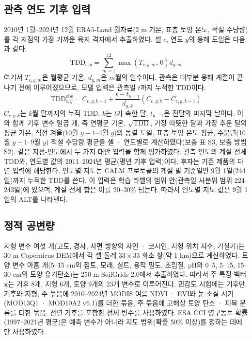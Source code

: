 \subsection{관측 연도 기후 입력}
2010년 1월--2024년 12월 ERA5-Land 월자료\cite{munozsabater2021_era5_land}(2 m 기온, 표층 토양 온도, 적설 수당량)를 각 지점의 가장 가까운 육지 격자에서 추출하였다. 셀 $c$, 연도 $y$의 융해 도일은 다음과 같다.
\begin{equation}
\mathrm{TDD}_{c,y} = \sum_{m=1}^{12} \max\!\left(T_{c,y,m},\,0\right) d_{y,m}
\label{eq:tdd}
\end{equation}
여기서 $T_{c,y,m}$은 월평균 기온, $d_{y,m}$은 $m$월의 일수이다. 관측은 대부분 융해 계절이 끝나기 전에 이루어졌으므로, 모델 입력은 관측일 $t$까지 누적한 TDD이다.
\begin{equation}
\mathrm{TDD}^{\mathrm{obs}}_{c,y} = C_{c,y,k-1} + \frac{t - t_{k-1}}{d_{y,k}} \left( C_{c,y,k} - C_{c,y,k-1} \right)
\label{eq:tddobs}
\end{equation}
$C_{c,y,k}$는 $k$월 말까지의 누적 TDD, $k$는 $t$가 속한 달, $t_{k-1}$은 전달의 마지막 날이다. 이와 함께 기후 변수 일곱 개, 즉 연평균 기온, $\sqrt{\mathrm{TDD}}$, 가장 따뜻한 달과 가장 추운 달의 평균 기온, 직전 겨울(10월 $y-1$--4월 $y$)의 동결 도일, 표층 토양 온도 평균, 수문년(10월 $y-1$--9월 $y$) 적설 수당량 평균을 셀 · 연도별로 계산하였다(보충 표 S3, 보충 방법 S2). 같은 지점-연도에서 두 가지 대안 입력을 함께 평가하였다. 관측 연도의 계절 전체 TDD와, 연도별 값의 2011--2024년 평균(평년 기후 입력)이다. 후자는 기존 제품의 다년 입력에 해당한다. 연도별 지도는 CALM 프로토콜의 계절 말 기준일인 9월 1일(244일)까지 누적한 TDD를 쓴다. 이 입력은 학습 라벨의 범위 안(관측일 사분위 범위 224--243일)에 있으며, 계절 전체 합은 이를 20--30\% 넘는다. 따라서 연도별 지도 값은 9월 1일의 ALT를 나타낸다.

\subsection{정적 공변량}
지형 변수 여섯 개(고도, 경사, 사면 방향의 사인 · 코사인, 지형 위치 지수, 거칠기)는 30 m Copernicus DEM\cite{CopDEM2021}에서 각 셀 둘레 $33\times33$ 화소 창(약 1 km)으로 계산하였다. 토양 변수 아홉 개(5--15 cm의 점토, 모래, 실트, 용적 밀도, 조립질, pH와 0--5, 5--15, 15--30 cm의 토양 유기탄소)는 250 m SoilGrids 2.0\cite{Poggio2021}에서 추출하였다. 따라서 주 특징 벡터 $\mathbf{x}$는 기후 8개, 지형 6개, 토양 9개의 23개 변수로 이루어진다. 민감도 시험에는 기후만, 기후와 지형, 주 묶음에 2010--2024년 MODIS 여름 NDVI · EVI와 눈 소실 시기(MOD13Q1 · MOD10A2 v6.1)\cite{Didan2021,HallRiggs2021}를 더한 묶음, 주 묶음에 고해상 토양 탄소 · 피복 분류\cite{Palmtag2022}를 더한 묶음, 전년 기후를 포함한 전체 변수를 사용하였다. ESA CCI 영구동토 확률(1997--2021년 평균)\cite{Westermann2024}은 예측 변수가 아니라 지도 범위(확률 50\% 이상)를 정하는 데에만 사용하였다.

